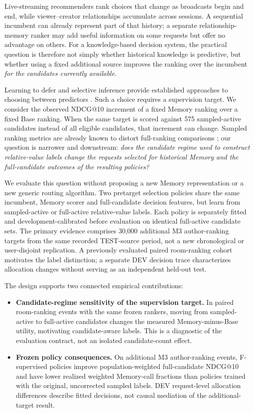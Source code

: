 \documentclass[preprint,12pt]{elsarticle}
\begin{document}
Live-streaming recommenders rank choices that change as broadcasts begin and end, while viewer--creator relationships accumulate across sessions. A sequential incumbent can already represent part of that history; a separate relationship-memory ranker may add useful information on some requests but offer no advantage on others. For a knowledge-based decision system, the practical question is therefore not simply whether historical knowledge is predictive, but whether using a fixed additional source improves the ranking over the incumbent \emph{for the candidates currently available}.

Learning to defer and selective inference provide established approaches to choosing between predictors \cite{mozannar2020defer,mao2024regression}. Such a choice requires a supervision target. We consider the observed NDCG@10 increment of a fixed Memory ranking over a fixed Base ranking. When the same target is scored against 575 sampled-active candidates instead of all eligible candidates, that increment can change. Sampled ranking metrics are already known to distort full-ranking comparisons \cite{krichene2020kdd}; our question is narrower and downstream: \emph{does the candidate regime used to construct relative-value labels change the requests selected for historical Memory and the full-candidate outcomes of the resulting policies?}

We evaluate this question without proposing a new Memory representation or a new generic routing algorithm. Two pretarget selection policies share the same incumbent, Memory scorer and full-candidate decision features, but learn from sampled-active or full-active relative-value labels. Each policy is separately fitted and development-calibrated before evaluation on identical full-active candidate sets. The primary evidence comprises 30,000 additional M3 author-ranking targets from the same recorded TEST-source period, not a new chronological or user-disjoint replication. A previously evaluated paired room-ranking cohort motivates the label distinction; a separate DEV decision trace characterizes allocation changes without serving as an independent held-out test.

The design supports two connected empirical contributions:
\begin{itemize}
    \item \textbf{Candidate-regime sensitivity of the supervision target.} In paired room-ranking events with the same frozen rankers, moving from sampled-active to full-active candidates changes the measured Memory-minus-Base utility, motivating candidate-aware labels. This is a diagnostic of the evaluation contract, not an isolated candidate-count effect.
    \item \textbf{Frozen policy consequences.} On additional M3 author-ranking events, F-supervised policies improve population-weighted full-candidate NDCG@10 and have lower realized weighted Memory-call fractions than policies trained with the original, uncorrected sampled labels. DEV request-level allocation differences describe fitted decisions, not causal mediation of the additional-target result.
\end{itemize}
\end{document}
